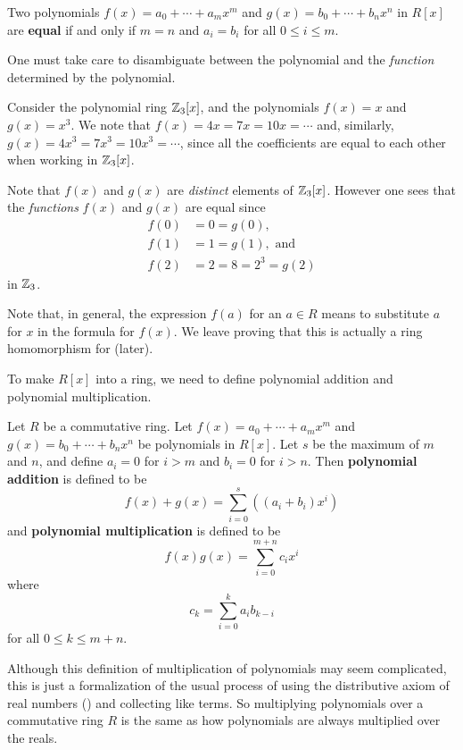 \begin{definition}
    Two polynomials $f(x) = a_0 + \cdots + a_mx^m$ and $g(x) = b_0 + \cdots + b_nx^n$ in $R[x]$ are \textbf{equal} if and only if $m = n$ and $a_i = b_i$ for all $0 \leq i \leq m$.
\end{definition}

One must take care to disambiguate between the polynomial and the \textit{function} determined by the polynomial.
\begin{example}
    Consider the polynomial ring $\mathbb{Z}_3[x]$, and the polynomials $f(x) = x$ and $g(x) = x^3$. We note that $f(x) = 4x = 7x = 10x = \cdots$ and, similarly, $g(x) = 4x^3 = 7x^3 = 10x^3 = \cdots$, since all the coefficients are equal to each other when working in $\mathbb{Z}_3[x]$.

    Note that $f(x)$ and $g(x)$ are \textit{distinct} elements of $\mathbb{Z}_3[x]$. However one sees that the \textit{functions} $f(x)$ and $g(x)$ are equal since
    \begin{align*}
        f(0) &= 0 = g(0),\\
        f(1) &= 1 = g(1), \text{ and }\\
        f(2) &= 2 = 8 = 2^3 = g(2)
    \end{align*}
    in $\mathbb{Z}_3$.
\end{example}

Note that, in general, the expression $f(a)$ for an $a \in R$ means to substitute $a$ for $x$ in the formula for $f(x)$. We leave proving that this is actually a ring homomorphism for  (later).

To make $R[x]$ into a ring, we need to define polynomial addition and polynomial multiplication.
\begin{definition}
    Let $R$ be a commutative ring. Let $f(x) = a_0 + \cdots + a_mx^m$ and $g(x) = b_0 + \cdots + b_nx^n$ be polynomials in $R[x]$. Let $s$ be the maximum of $m$ and $n$, and define $a_i = 0$ for $i > m$ and $b_i = 0$ for $i > n$. Then \textbf{polynomial addition} is defined to be
    \[
        f(x)+g(x) = \sum_{i=0}^s\left((a_i+b_i)x^i\right)
    \]
    and \textbf{polynomial multiplication} is defined to be
    \[
        f(x)g(x) = \sum_{i=0}^{m+n}c_ix^i
    \]
    where
    \[
        c_k = \sum_{i=0}^k a_ib_{k-i}
    \]
    for all $0 \leq k \leq m + n$.
\end{definition}
Although this definition of multiplication of polynomials may seem complicated, this is just a formalization of the usual process of using the distributive axiom of real numbers () and collecting like terms. So multiplying polynomials over a commutative ring $R$ is the same as how polynomials are always multiplied over the reals.

